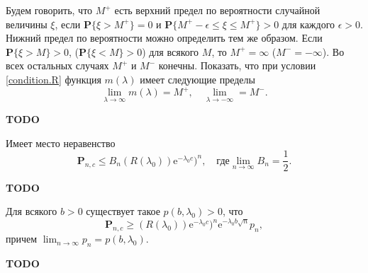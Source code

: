 \begin{problem}
Будем говорить, что $M^{+}$ есть верхний предел по вероятности случайной величины $\xi$, если $\mathbf{P}\{\xi>M^{+}\} = 0$ и $\mathbf{P}\{M^{+}-\epsilon\leq\xi\leq M^{+}\}>0$ для каждого  $\epsilon>0$. Нижний предел по вероятности можно определить тем же образом. Если $\mathbf{P}\{\xi>M\}>0$, ($\mathbf{P}\{\xi<M\}>0$) для всякого $M$, то $M^{+}=\infty$ ($M^{-}=-\infty$). Во всех остальных случаях $M^{+}$ и $M^{-}$ конечны.
Показать, что при условии \eqref{condition.R} 
функция $m(\lambda)$ имеет следующие пределы
\begin{equation*}
\lim_{\lambda\to\infty}m(\lambda) = M^{+},\quad \lim_{\lambda\to -\infty} = M^{-}.
\end{equation*}
\end{problem}
\begin{remark}

\textbf{TODO}

\end{remark}
\begin{problem}
Имеет место неравенство 
\begin{equation*}
\mathbf{P}_{n,c} \leq B_n(R(\lambda_0))\text{e}^{-\lambda_0c})^n,\quad\text{где} \lim_{n\to\infty}B_n=\frac{1}{2}.
\end{equation*}
\end{problem}
\begin{remark}

\textbf{TODO}

\end{remark}
\begin{problem}
Для всякого $b>0$ существует такое $p(b,\lambda_0)>0$, что 
\begin{equation*}
\mathbf{P}_{n,c} \geq (R(\lambda_0))\text{e}^{-\lambda_0c})^n\text{e}^{-\lambda_0 b \sqrt{n}} p_n, 
\end{equation*}
причем $\lim_{n\to\infty}p_n = p(b,\lambda_0)$.
\end{problem}
\begin{remark}
\textbf{TODO}
\end{remark}

